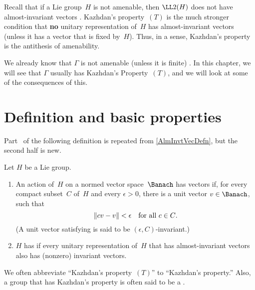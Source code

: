 
\label{KazhdanTChap}


Recall that if a Lie group~$H$ is not amenable, then $\LL2(H)$ does not
have almost-invariant vectors . Kazhdan's property~$(T)$ is the much stronger condition that \textbf{no} unitary representation
of~$H$ has almost-invariant vectors (unless it has a vector that is fixed by~$H$).
Thus, in a sense, Kazhdan's property is the antithesis of amenability.

We already know that $\Gamma$ is not amenable (unless it is finite) . In this chapter, we will see that $\Gamma$ usually has Kazhdan's Property~$(T)$, and we will look at some of the consequences of this.


\section{Definition and basic properties}

Part~ of the following definition is repeated from \cref{AlmInvtVecDefn}, but the second half is new.

\begin{defn} \label{KazhdanTDefn}
Let $H$ be a Lie group. 
\noprelistbreak
\begin{enumerate}
\item \label{KazhdanTDefn-alminvt}
An action of~$H$ on a normed vector space~$\Banach$ has  vectors if, for every
compact subset~$C$ of~$H$ and every $\epsilon > 0$, there
is a unit vector
 $v \in \Banach$, such that 
 \begin{equation} \label{KazhdanTDefn-epsCInvt}
 \|c v - v \| < \epsilon \text{\quad for all $c \in C$}
.\end{equation}
(A unit vector satisfying  is said to be $(\epsilon,C)$-invariant.)

\item $H$ has  if every unitary representation of~$H$ that has almost-invariant vectors also has (nonzero) invariant vectors.
\end{enumerate}
We often abbreviate ``Kazhdan's property~$(T)$'' to ``Kazhdan's property\zz.'' Also, a group that has Kazhdan's property is often said to be a .
 \end{defn}
 
